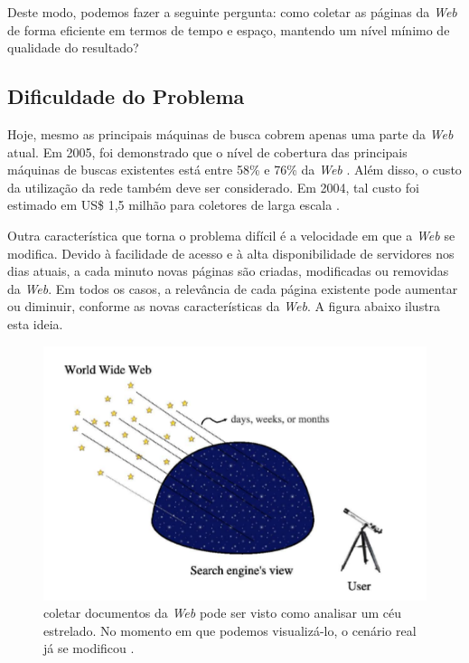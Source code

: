 \documentclass[a4paper,12pt,titlepage]{article}
\begin{document}
Deste modo, podemos fazer a seguinte pergunta: como coletar as páginas da \textit{Web} de forma eficiente em termos de tempo e espaço, mantendo um nível mínimo de qualidade do resultado?

\subsection{Dificuldade do Problema}

Hoje, mesmo as principais máquinas de busca cobrem apenas uma parte da \textit{Web} atual. Em 2005, foi demonstrado que o nível de cobertura das principais máquinas de buscas existentes está entre 58\% e 76\% da \textit{Web} \cite{gulli}. Além disso, o custo da utilização da rede também deve ser considerado. Em 2004, tal custo foi estimado em US\$ 1,5 milhão para coletores de larga escala \cite{craswell}. 

Outra característica que torna o problema difícil é a velocidade em que a \textit{Web} se modifica. Devido à facilidade de acesso e à alta disponibilidade de servidores nos dias atuais, a cada minuto novas páginas são criadas, modificadas ou removidas da \textit{Web}. Em todos os casos, a relevância de cada página existente pode aumentar ou diminuir, conforme as novas características da \textit{Web}. A figura abaixo ilustra esta ideia.

\begin{figure}[H]
     \centering
     \includegraphics[scale=0.3]{figures/stars.png}
     \caption{coletar documentos da \textit{Web} pode ser visto como analisar um céu estrelado. No momento em que podemos visualizá-lo, o cenário real já se modificou \cite{carlos}.}
     \label{bsp}
\end{figure}
\end{document}

